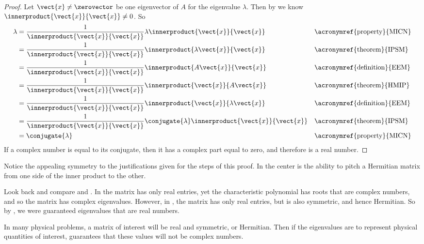 \begin{proof}
Let $\vect{x}\neq\zerovector$ be one eigenvector of $A$ for the eigenvalue $\lambda$.   Then by  we know $\innerproduct{\vect{x}}{\vect{x}}\neq 0$.  So
%
\begin{align*}
\lambda
%
&=\frac{1}{\innerproduct{\vect{x}}{\vect{x}}}\lambda\innerproduct{\vect{x}}{\vect{x}}
&&\text{\acronymref{property}{MICN}}\\
%
&=\frac{1}{\innerproduct{\vect{x}}{\vect{x}}}\innerproduct{\lambda\vect{x}}{\vect{x}}
&&\text{\acronymref{theorem}{IPSM}}\\
%
&=\frac{1}{\innerproduct{\vect{x}}{\vect{x}}}\innerproduct{A\vect{x}}{\vect{x}}
&&\text{\acronymref{definition}{EEM}}\\
%
&=\frac{1}{\innerproduct{\vect{x}}{\vect{x}}}\innerproduct{\vect{x}}{A\vect{x}}
&&\text{\acronymref{theorem}{HMIP}}\\
%
&=\frac{1}{\innerproduct{\vect{x}}{\vect{x}}}\innerproduct{\vect{x}}{\lambda\vect{x}}
&&\text{\acronymref{definition}{EEM}}\\
%
&=\frac{1}{\innerproduct{\vect{x}}{\vect{x}}}\conjugate{\lambda}\innerproduct{\vect{x}}{\vect{x}}
&&\text{\acronymref{theorem}{IPSM}}\\
%
&=\conjugate{\lambda}
&&\text{\acronymref{property}{MICN}}
\end{align*}
%
If a complex number is equal to its conjugate, then it has a complex part equal to zero, and therefore is a real number.
%
\end{proof}
%
Notice the appealing symmetry to the justifications given for the steps of this proof.  In the center is the ability to pitch a Hermitian matrix from one side of the inner product to the other.\par
%
Look back and compare  and .   In  the matrix has only real entries, yet the characteristic polynomial has roots that are complex numbers, and so the matrix has complex eigenvalues.  However, in , the matrix has only real entries, but is also symmetric, and hence Hermitian.  So by , we were guaranteed eigenvalues that are real numbers.\par
%
In many physical problems, a matrix of interest will be real and symmetric, or Hermitian.  Then if the eigenvalues are to represent physical quantities of interest,  guarantees that these values will not be complex numbers.\par
